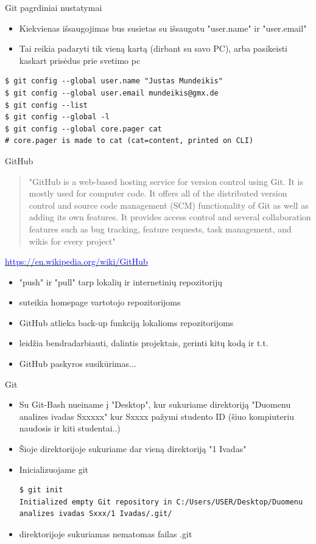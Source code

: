 \documentclass[11pt,xcolor=table]{beamer}
\begin{document}
\begin{frame}[fragile]{Git pagrdiniai nustatymai}
\begin{itemize}
\item Kiekvienas išsaugojimas bus susietas su išsaugotu "user.name" ir "user.email"
\item Tai reikia padaryti tik vieną kartą (dirbant su savo PC), arba pasikeisti kaskart prisėdus prie svetimo pc
\end{itemize}
\begin{lstlisting}
$ git config --global user.name "Justas Mundeikis"
$ git config --global user.email mundeikis@gmx.de
$ git config --list
$ git config --global -l
$ git config --global core.pager cat 
# core.pager is made to cat (cat=content, printed on CLI)
\end{lstlisting}
\end{frame}
\begin{frame}{GitHub}
\begin{quote}
"GitHub  is a web-based hosting service for version control using Git. It is mostly used for computer code. It offers all of the distributed version control and source code management (SCM) functionality of Git as well as adding its own features. It provides access control and several collaboration features such as bug tracking, feature requests, task management, and wikis for every project"
\end{quote}
\href{https://en.wikipedia.org/wiki/GitHub}{\textcolor{blue}{https://en.wikipedia.org/wiki/GitHub}}

\begin{itemize}
\item "push" ir "pull" tarp lokalių ir internetinių repozitorijų
\item suteikia homepage vartotojo repozitorijoms
\item GitHub atlieka back-up funkciją lokalioms repozitorijoms
\item leidžia bendradarbiauti, dalintis projektais, gerinti kitų kodą ir t.t.
\item GitHub paskyros susikūrimas...
\end{itemize}
\end{frame}
\begin{frame}[fragile]{Git}
\begin{itemize}
\item Su Git-Bash nueiname į "Desktop", kur sukuriame direktoriją "Duomenu analizes ivadas Sxxxxx" kur Sxxxx pažymi studento ID (šiuo kompiuteriu naudosis ir kiti studentai..)
\item Šioje direktorijoje sukuriame dar vieną direktoriją "1 Ivadas"
\item Inicializuojame git
\begin{lstlisting}
$ git init
Initialized empty Git repository in C:/Users/USER/Desktop/Duomenu analizes ivadas Sxxx/1 Ivadas/.git/
\end{lstlisting}
\item direktorijoje sukuriamas nematomas failas .git
\end{itemize}
\end{frame}
\end{document}
